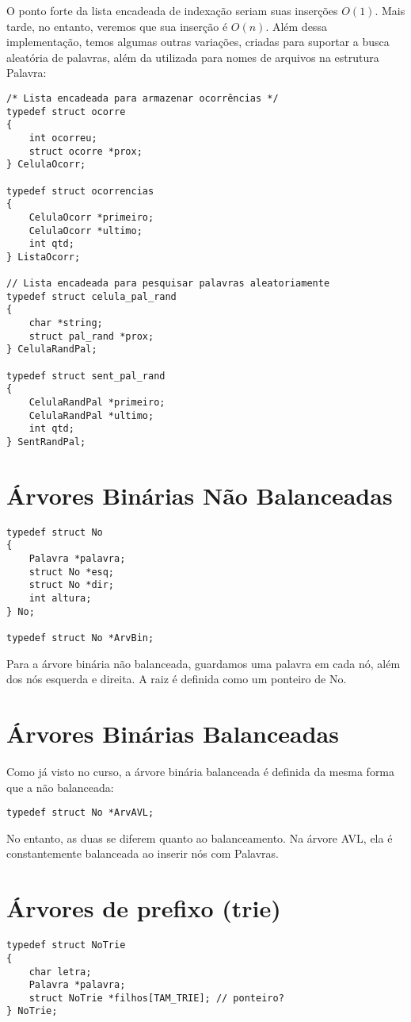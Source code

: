 O ponto forte da lista encadeada de indexação seriam suas inserções $O(1)$. Mais tarde, no entanto, veremos que sua inserção é $O(n)$. Além dessa implementação, temos algumas outras variações, criadas para suportar a busca aleatória de palavras, além da utilizada para nomes de arquivos na estrutura Palavra:

\begin{lstlisting}
/* Lista encadeada para armazenar ocorrências */
typedef struct ocorre
{
    int ocorreu;
    struct ocorre *prox;
} CelulaOcorr;

typedef struct ocorrencias
{
    CelulaOcorr *primeiro;
    CelulaOcorr *ultimo;
    int qtd;
} ListaOcorr;

// Lista encadeada para pesquisar palavras aleatoriamente
typedef struct celula_pal_rand
{
    char *string;
    struct pal_rand *prox;
} CelulaRandPal;

typedef struct sent_pal_rand
{
    CelulaRandPal *primeiro;
    CelulaRandPal *ultimo;
    int qtd;
} SentRandPal;
\end{lstlisting}


\section{Árvores Binárias Não Balanceadas}\label{tadArvBin}
\begin{lstlisting}
typedef struct No
{
    Palavra *palavra;
    struct No *esq;
    struct No *dir;
    int altura;
} No;

typedef struct No *ArvBin;
\end{lstlisting}

Para a árvore binária não balanceada, guardamos uma palavra em cada nó, além dos nós esquerda e direita. A raiz é definida como um ponteiro de No.

\section{Árvores Binárias Balanceadas}\label{tadAVL}
Como já visto no curso, a árvore binária balanceada é definida da mesma forma que a não balanceada:
\begin{lstlisting}
typedef struct No *ArvAVL;
\end{lstlisting}

No entanto, as duas se diferem quanto ao balanceamento. Na árvore AVL, ela é constantemente balanceada ao inserir nós com Palavras.

\section{Árvores de prefixo (trie)}\label{tadTrie}
\begin{lstlisting}
typedef struct NoTrie
{
    char letra;
    Palavra *palavra;
    struct NoTrie *filhos[TAM_TRIE]; // ponteiro?
} NoTrie;
\end{lstlisting}

